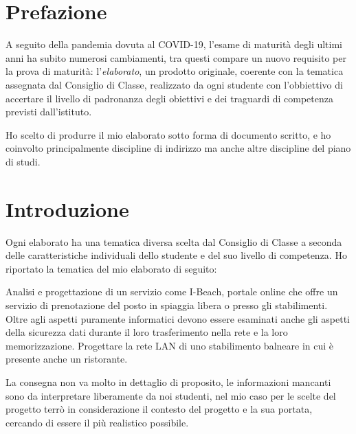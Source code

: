 \section*{Prefazione}
A seguito della pandemia dovuta al COVID-19, l'esame di maturit\`a degli ultimi anni ha subito numerosi cambiamenti, tra questi compare un nuovo requisito per la prova di maturit\`a: l'\emph{elaborato}, un prodotto originale, coerente con la tematica assegnata dal Consiglio di Classe, realizzato da ogni studente con l'obbiettivo di accertare il livello di padronanza degli obiettivi e dei traguardi di competenza previsti dall'istituto. %

Ho scelto di produrre il mio elaborato sotto forma di documento scritto, e ho coinvolto principalmente discipline di indirizzo ma anche altre discipline del piano di studi.

\section{Introduzione}
Ogni elaborato ha una tematica diversa scelta dal Consiglio di Classe a seconda delle caratteristiche individuali dello studente e del suo livello di competenza. Ho riportato la tematica del mio elaborato di seguito:

\begin{center}
    \begin{minipage}{0.8\linewidth}
        Analisi e progettazione di un servizio come I-Beach, portale online che offre un
        servizio di prenotazione del posto in spiaggia libera o presso gli stabilimenti.
        Oltre agli aspetti puramente informatici devono essere esaminati anche gli aspetti
        della sicurezza dati durante il loro trasferimento nella rete e la loro
        memorizzazione. Progettare la rete LAN di uno stabilimento balneare in cui è presente
        anche un ristorante. 
    \end{minipage}
\end{center}

La consegna non va molto in dettaglio di proposito, le informazioni mancanti sono da interpretare liberamente da noi studenti, nel mio caso per le scelte del progetto terr\`o in considerazione il contesto del progetto e la sua portata, cercando di essere il pi\`u realistico possibile.